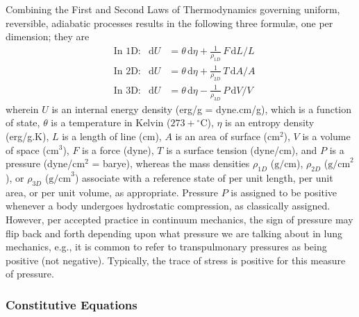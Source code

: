 Combining the First and Second Laws of Thermo\-dynamics governing uniform, reversible, adiabatic processes results in the following three formul\ae, one per dimension; they are
\begin{subequations}
    \label{thermoelasticLaws}
    \begin{align}
    \mbox{} & \text{In 1D:} & 
    \mathrm{d}U & = \theta \, \mathrm{d} \eta +
    \tfrac{1}{\rho_{1D}} \, F \, \mathrm{d}L / L
    \label{thermoelastic1Dlaw} \\
    \mbox{} & \text{In 2D:} &
    \mathrm{d}U & = \theta \, \mathrm{d} \eta + 
    \tfrac{1}{\rho_{2D}} \, T \, \mathrm{d}A / \! A
    \label{thermoelastic2Dlaw} \\
    \mbox{} & \text{In 3D:} &
    \mathrm{d}U & = \theta \, \mathrm{d} \eta - 
    \tfrac{1}{\rho_{3D}} \, P \, \mathrm{d}V \! / V \!
    \label{thermoelastic3Dlaw}
    \end{align}
\end{subequations}
wherein $U$ is an internal energy density (erg/g = dyne.cm/g), which is a function of state, $\theta$ is a temperature in Kelvin ($273 + \mbox{}^{\circ}$C), $\eta$ is an entropy density (erg/g.K), $L$ is a length of line (cm), $A$ is an area of surface ($\text{cm}^2$), $V$ is a volume of space ($\text{cm}^3$), $F$ is a force (dyne), $T$ is a surface tension (dyne/cm), and $P$ is a pressure (dyne/$\text{cm}^2$ = barye), whereas the mass densities $\rho_{1D}$ ($\text{g/cm}$), $\rho_{2D}$ ($\text{g/cm}^2$), or $\rho_{3D}$ ($\text{g/cm}^3$) associate with a reference state of per unit length, per unit area, or per unit volume, as appropriate.  Pressure $P$ is assigned to be positive whenever a body undergoes hydro\-static compression, as classically assigned.  However, per accepted practice in continuum mechanics, the sign of pressure may flip back and forth depending upon what pressure we are talking about in lung mechanics, e.g., it is common to refer to transpulmonary pressures as being positive (not negative). Typically, the trace of stress is positive for this measure of pressure.

\subsubsection{Constitutive Equations}

